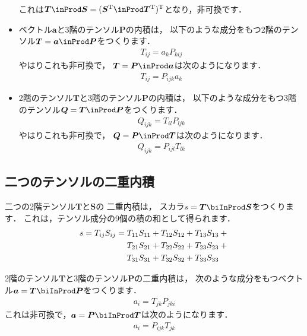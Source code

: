 \begin{itemize}
       これは$\bm{T} \inProd \bm{S} =
       (\bm{S}^{\mathrm{T}} \inProd \bm{T}^{\mathrm{T}})^{\mathrm{T}}$となり，非可換です．
 \item ベクトル$\bm{a}$と3階のテンソル$\bm{P}$の内積は，
       以下のような成分をもつ2階のテンソル$\bm{T} = \bm{a} \inProd \bm{P}$をつくります．
       \begin{align}
        \label{eq:1.11}
        T_{ij} = a_{k}P_{kij}
       \end{align}
       やはりこれも非可換で，
       $\bm{T} = \bm{P} \inProd \bm{a}$は次のようになります．
       \begin{align}
        \label{eq:1.12}
        T_{ij} = P_{ijk}a_{k}
       \end{align}
 \item 2階のテンソル$\bm{T}$と3階のテンソル$\bm{P}$の内積は，
       以下のような成分をもつ3階のテンソル$\bm{Q} = \bm{T} \inProd \bm{P}$をつくります．
       \begin{align}
        \label{eq:1.13}
        Q_{ijk} = T_{il}P_{ljk}
       \end{align}
       やはりこれも非可換で，
       $\bm{Q} = \bm{P} \inProd \bm{T}$は次のようになります．
       \begin{align}
        \label{eq:1.14}
        Q_{ijk} = P_{ijl}T_{lk}
       \end{align}
\end{itemize}


\subsection{二つのテンソルの二重内積}
\label{ssec:1.3.2}
二つの2階テンソル$\bm{T}$と$\bm{S}$の
%
二重内積は，
スカラ$s = \bm{T} \biInProd \bm{S}$をつくります．
これは，テンソル成分の9個の積の和として得られます．
\begin{align}
 \label{eq:1.15}
 \begin{aligned}
  s = T_{ij}S_{ij} &= T_{11}S_{11} + T_{12}S_{12} + T_{13}S_{13} + {} \\
  &\hphantom{{}={}} T_{21}S_{21} + T_{22}S_{22} + T_{23}S_{23} + {} \\
  &\hphantom{{}={}} T_{31}S_{31} + T_{32}S_{32} + T_{33}S_{33}
 \end{aligned}
\end{align}

2階のテンソル$\bm{T}$と3階のテンソル$\bm{P}$の二重内積は，
次のような成分をもつベクトル$\bm{a} = \bm{T} \biInProd \bm{P}$をつくります．
\begin{align}
 \label{eq:1.16}
 a_{i} = T_{jk}P_{jki}
\end{align}
これは非可換で，$\bm{a} = \bm{P} \biInProd \bm{T}$は次のようになります．
\begin{align}
 \label{eq:1.17}
 a_{i} = P_{ijk}T_{jk}
\end{align}


